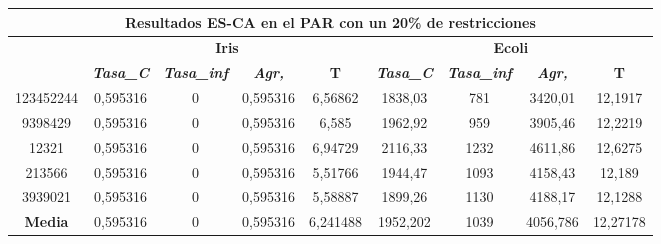 \documentclass[12pt, spanish]{article}
\begin{document}
\begin{table}[H]
\begin{tabular}{|c|c|c|c|c|c|c|c|c|}
\hline
\multicolumn{9}{|c|}{\textbf{Resultados ES-CA en el PAR con un 20\% de restricciones}}                                                                                                                            \\ \hline
\multirow{2}{*}{} & \multicolumn{4}{c|}{\textbf{Iris}}                                                            & \multicolumn{4}{c|}{\textbf{Ecoli}}                                                           \\ \cline{2-9} 
                  & \textit{\textbf{Tasa\_C}} & \textit{\textbf{Tasa\_inf}} & \textit{\textbf{Agr,}} & \textbf{T} & \textit{\textbf{Tasa\_C}} & \textit{\textbf{Tasa\_inf}} & \textit{\textbf{Agr,}} & \textbf{T} \\ \hline
123452244         & 0,595316                  & 0                           & 0,595316               & 6,56862    & 1838,03                   & 781                         & 3420,01                & 12,1917    \\ \hline
9398429           & 0,595316                  & 0                           & 0,595316               & 6,585      & 1962,92                   & 959                         & 3905,46                & 12,2219    \\ \hline
12321             & 0,595316                  & 0                           & 0,595316               & 6,94729    & 2116,33                   & 1232                        & 4611,86                & 12,6275    \\ \hline
213566            & 0,595316                  & 0                           & 0,595316               & 5,51766    & 1944,47                   & 1093                        & 4158,43                & 12,189     \\ \hline
3939021           & 0,595316                  & 0                           & 0,595316               & 5,58887    & 1899,26                   & 1130                        & 4188,17                & 12,1288    \\ \hline
\textbf{Media}    & 0,595316                  & 0                           & 0,595316               & 6,241488   & 1952,202                  & 1039                        & 4056,786               & 12,27178   \\ \hline
\end{tabular}
\end{table}
\end{document}
